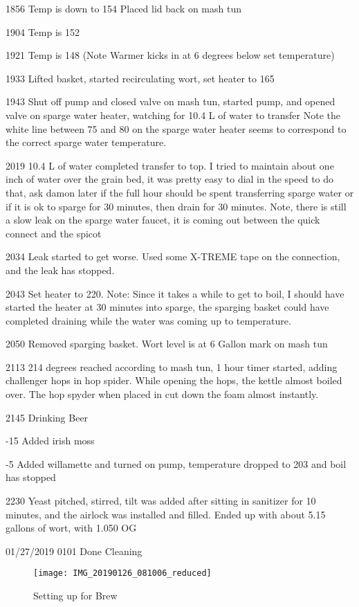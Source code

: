 1856 Temp is down to 154 Placed lid back on mash tun

1904 Temp is 152

1921 Temp is 148 (Note Warmer kicks in at 6 degrees below set temperature)

1933 Lifted basket, started recirculating wort, set heater to 165

1943 Shut off pump and closed valve on mash tun, started pump, and opened valve on sparge water heater, watching for 10.4 L of water to transfer  Note the white line between 75 and 80 on the sparge water heater seems to correspond to the correct sparge water temperature.

2019 10.4 L of water completed transfer to top.  I tried to maintain about one inch of water over the grain bed, it was pretty easy to dial in the speed to do that, ask damon later if the full hour should be spent transferring sparge water or if it is ok to sparge for 30 minutes, then drain for 30 minutes.  Note, there is still a slow leak on the sparge water faucet, it is coming out between the quick connect and the spicot

2034 Leak started to get worse.  Used some X-TREME tape on the connection, and the leak has stopped.

2043 Set heater to 220.  Note: Since it takes a while to get to boil, I should have started the heater at 30 minutes into sparge, the sparging basket could have completed draining while the water was coming up to temperature.

2050 Removed sparging basket.  Wort level is at 6 Gallon mark on mash tun

2113 214 degrees reached according to mash tun, 1 hour timer started, adding challenger hops in hop spider.  While opening the hops, the kettle almost boiled over.  The hop spyder when placed in cut down the foam almost instantly.

2145 Drinking Beer

-15 Added irish moss

-5 Added willamette and turned on pump, temperature dropped to 203 and boil has stopped

2230 Yeast pitched, stirred, tilt was added after sitting in sanitizer for 10 minutes, and the airlock was installed and filled.  Ended up with about 5.15 gallons of wort, with 1.050 OG

01/27/2019
0101 Done Cleaning

\begin{figure}[H]
  \centering
  \texttt{[image: IMG\_20190126\_081006\_reduced]}
  \caption{Setting up for Brew}\label{fig:brew:setup}
\end{figure}

